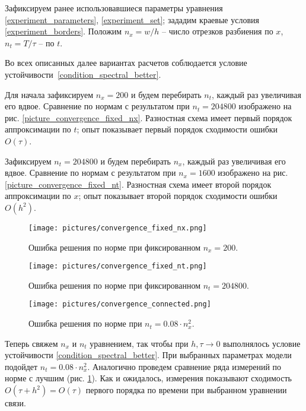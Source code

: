 \documentclass[a4paper,12pt]{article}
\theoremstyle{plain}
\theoremstyle{definition}
\begin{document}
Зафиксируем ранее использовавшиеся параметры уравнения \eqref{experiment_parameters}, \eqref{experiment_set}; зададим краевые условия \eqref{experiment_borders}. Положим $n_x = w / h$ -- число отрезков разбиения по $x$, $n_t = T / \tau$ -- по $t$.

Во всех описанных далее вариантах расчетов соблюдается условие устойчивости~\eqref{condition_spectral_better}.

Для начала зафиксируем $n_x = 200$ и будем перебирать $n_t$, каждый раз увеличивая его вдвое. Сравнение по нормам с результатом при $n_t = 204800$ изображено на рис. \ref{picture_convergence_fixed_nx}. Разностная схема имеет первый порядок аппроксимации по $t$; опыт показывает первый порядок сходимости ошибки $O(\tau)$.

Зафиксируем $n_t = 204800$ и будем перебирать $n_x$, каждый раз увеличивая его вдвое. Сравнение по нормам с результатом при $n_x = 1600$ изображено на рис. \ref{picture_convergence_fixed_nt}. Разностная схема имеет второй порядок аппроксимации по $x$; опыт показывает второй порядок сходимости ошибки $O(h^2)$.

\begin{figure}[!tp]
    \centering
    \texttt{[image: pictures/convergence\_fixed\_nx.png]}
    \vspace{-0.2cm}
    \caption{Ошибка решения по норме при фиксированном $n_x = 200$.}
    \label{picture_convergence_fixed_nx}
    \vspace{0.7cm}
    
    \texttt{[image: pictures/convergence\_fixed\_nt.png]}
    \vspace{-0.2cm}
    \caption{Ошибка решения по норме при фиксированном $n_t = 204800$.}
    \label{picture_convergence_fixed_nt}
    \vspace{0.7cm}
    
    \texttt{[image: pictures/convergence\_connected.png]}
    \vspace{-0.2cm}
    \caption{Ошибка решения по норме при $n_t = 0.08 \cdot n_x^2$.}
    \label{picture_convergence_connected}
\end{figure}

Теперь свяжем $n_x$ и $n_t$ уравнением, так чтобы при $h, \tau \to 0$ выполнялось условие устойчивости \eqref{condition_spectral_better}. При выбранных параметрах модели подойдет $n_t = 0.08 \cdot n_x^2$. Аналогично проведем сравнение ряда измерений по норме с лучшим (рис. \ref{picture_convergence_connected}). Как и ожидалось, измерения показывают сходимость $O(\tau + h^2) = O(\tau)$ первого порядка по времени при выбранном уравнении связи.
\end{document}
